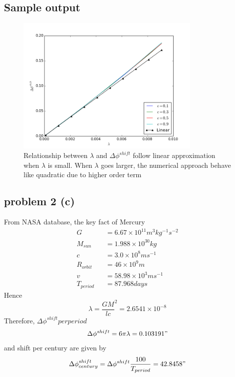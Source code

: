 \documentclass[12pt]{article}
\begin{document}
\subsection{Sample output}
\begin{figure}[h!]
	\begin{center}
		\includegraphics[width=0.8\textwidth]{problem2a.png}
		\caption{Relationship between $\lambda$ and $\Delta\phi^{shift}$ follow linear approximation when $\lambda$ is small. When $\lambda$ goes larger, the numerical approach behave like quadratic due to higher order term}
		\label{fig4}
	\end{center}
\end{figure}

\subsection{problem 2 (c)}
From NASA database, the key fact of Mercury 
\begin{eqnarray}
	G&&=6.67\times 10^{11} m^3 kg^{-1} s^{-2}\nonumber\\
	M_{sun}&&=1.988\times 10^{30} kg\nonumber\\
	c&&=3.0\times 10^8 ms^{-1}\nonumber\\
	R_{orbit}&&=46\times 10^9 m\nonumber\\
	v&&=58.98\times 10^3 ms^{-1}\nonumber\\
	T_{period}&&=87.968 days
\end{eqnarray}
Hence
\begin{equation}
	\lambda=\frac{GM}{lc}^2=2.6541\times10^{-8}
\end{equation}
Therefore, $\Delta\phi^{shift} per period$
\begin{equation}
	\Delta\phi^{shift}=6\pi\lambda=0.103191"
\end{equation}
and shift per century are given by
\begin{equation}
	\Delta\phi^{shift}_{century}=\Delta\phi^{shift}\frac{100}{T_{period}}=42.8458"
\end{equation}
\end{document}
